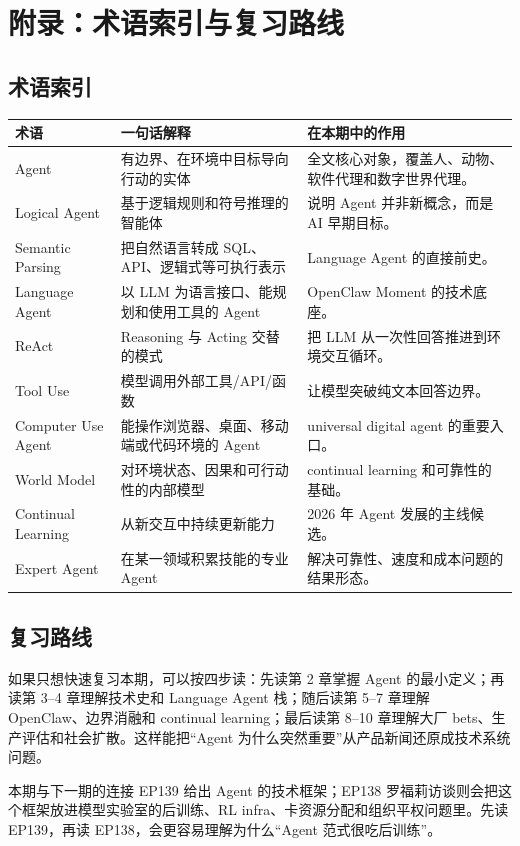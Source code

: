 \section{附录：术语索引与复习路线}

\subsection{术语索引}

\begin{longtable}{p{}p{}p{}}
\toprule
术语 & 一句话解释 & 在本期中的作用 \\
\midrule
Agent & 有边界、在环境中目标导向行动的实体 & 全文核心对象，覆盖人、动物、软件代理和数字世界代理。 \\
Logical Agent & 基于逻辑规则和符号推理的智能体 & 说明 Agent 并非新概念，而是 AI 早期目标。 \\
Semantic Parsing & 把自然语言转成 SQL、API、逻辑式等可执行表示 & Language Agent 的直接前史。 \\
Language Agent & 以 LLM 为语言接口、能规划和使用工具的 Agent & OpenClaw Moment 的技术底座。 \\
ReAct & Reasoning 与 Acting 交替的模式 & 把 LLM 从一次性回答推进到环境交互循环。 \\
Tool Use & 模型调用外部工具/API/函数 & 让模型突破纯文本回答边界。 \\
Computer Use Agent & 能操作浏览器、桌面、移动端或代码环境的 Agent & universal digital agent 的重要入口。 \\
World Model & 对环境状态、因果和可行动性的内部模型 & continual learning 和可靠性的基础。 \\
Continual Learning & 从新交互中持续更新能力 & 2026 年 Agent 发展的主线候选。 \\
Expert Agent & 在某一领域积累技能的专业 Agent & 解决可靠性、速度和成本问题的结果形态。 \\
\bottomrule
\end{longtable}

\subsection{复习路线}

如果只想快速复习本期，可以按四步读：先读第 2 章掌握 Agent 的最小定义；再读第 3--4 章理解技术史和 Language Agent 栈；随后读第 5--7 章理解 OpenClaw、边界消融和 continual learning；最后读第 8--10 章理解大厂 bets、生产评估和社会扩散。这样能把“Agent 为什么突然重要”从产品新闻还原成技术系统问题。

\begin{knowledgebox}{本期与下一期的连接}
EP139 给出 Agent 的技术框架；EP138 罗福莉访谈则会把这个框架放进模型实验室的后训练、RL infra、卡资源分配和组织平权问题里。先读 EP139，再读 EP138，会更容易理解为什么“Agent 范式很吃后训练”。
\end{knowledgebox}

